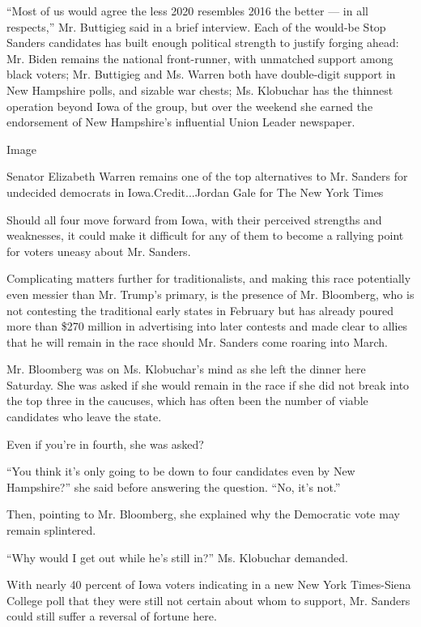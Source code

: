 ``Most of us would agree the less 2020 resembles 2016 the better --- in
all respects,'' Mr. Buttigieg said in a brief interview. Each of the
would-be Stop Sanders candidates has built enough political strength to
justify forging ahead: Mr. Biden remains the national front-runner, with
unmatched support among black voters; Mr. Buttigieg and Ms. Warren both
have double-digit support in New Hampshire polls, and sizable war
chests; Ms. Klobuchar has the thinnest operation beyond Iowa of the
group, but over the weekend she earned the endorsement of New
Hampshire's influential Union Leader newspaper.

Image

Senator Elizabeth Warren remains one of the top alternatives to Mr.
Sanders for undecided democrats in Iowa.Credit...Jordan Gale for The New
York Times

Should all four move forward from Iowa, with their perceived strengths
and weaknesses, it could make it difficult for any of them to become a
rallying point for voters uneasy about Mr. Sanders.

Complicating matters further for traditionalists, and making this race
potentially even messier than Mr. Trump's primary, is the presence of
Mr. Bloomberg, who is not contesting the traditional early states in
February but has already poured more than \$270 million in advertising
into later contests and made clear to allies that he will remain in the
race should Mr. Sanders come roaring into March.

Mr. Bloomberg was on Ms. Klobuchar's mind as she left the dinner here
Saturday. She was asked if she would remain in the race if she did not
break into the top three in the caucuses, which has often been the
number of viable candidates who leave the state.

Even if you're in fourth, she was asked?

``You think it's only going to be down to four candidates even by New
Hampshire?'' she said before answering the question. ``No, it's not.''

Then, pointing to Mr. Bloomberg, she explained why the Democratic vote
may remain splintered.

``Why would I get out while he's still in?'' Ms. Klobuchar demanded.

With nearly 40 percent of Iowa voters indicating in a new New York
Times-Siena College poll that they were still not certain about whom to
support, Mr. Sanders could still suffer a reversal of fortune here.

